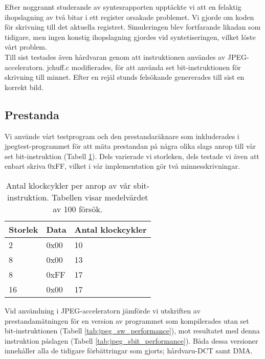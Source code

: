 \documentclass[a4paper]{article}
\begin{document}
Efter noggrannt studerande av syntesrapporten upptäckte vi att en felaktig ihopslagning av två bitar i ett
register orsakade problemet. Vi gjorde om koden för skrivning till det aktuella registret. Simuleringen blev
fortfarande likadan som tidigare, men ingen konstig ihopslagning gjordes vid syntetiseringen,
vilket löste vårt problem.\\

Till sist testades även hårdvaran genom att instruktionen användes av JPEG-acceleratorn. jchuff.c modifierades,
för att använda set bit-instruktionen för skrivning till minnet. Efter en rejäl stunds felsökande
genererades till sist en korrekt bild.\\

\subsection{Prestanda}
Vi använde vårt testprogram och den prestandaräknare som inkluderades i jpegtest-programmet för att mäta prestandan på
några olika slags anrop till vår set bit-instruktion (Tabell \ref{tab:sbit_performance}). Dels varierade vi storleken, dels testade vi även att enbart skriva 0xFF, vilket i vår implementation gör två minnesskrivningar.\\

\begin{table}[ht]
    \centering
    \begin{tabular}{l l l}
        Storlek &  Data  &   Antal klockcykler\\
        \hline
        2       &  0x00  &   10\\
        8       &  0x00  &   13\\
        8       &  0xFF  &   17\\
        16      &  0x00  &   17\\
    \end{tabular}
    \caption{ Antal klockcykler per anrop av vår sbit-instruktion. Tabellen visar medelvärdet av 100 försök. }
    \label{tab:sbit_performance}
\end{table}

Vid användning i JPEG-acceleratorn jämförde vi utskriften av prestandamätningen för en version av
programmet som kompilerades utan set bit-instruktionen (Tabell \ref{tab:jpeg_sw_performance}), mot resultatet med denna instruktion påslagen (Tabell \ref{tab:jpeg_sbit_performance}). Båda dessa versioner innehåller alla de tidigare förbättringar
som gjorts; hårdvaru-DCT samt DMA.
\end{document}
